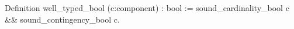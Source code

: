 Definition well_typed_bool (c:component) : bool := 
      sound_cardinality_bool c && sound_contingency_bool c.